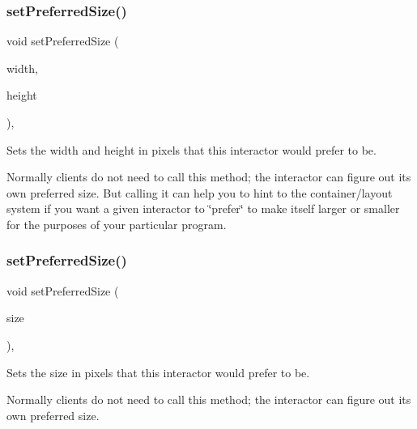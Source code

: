 \subsubsection{\texorpdfstring{set\+Preferred\+Size()}{setPreferredSize()}\hspace{0.1cm}{\footnotesize\ttfamily [1/2]}}
{\footnotesize\ttfamily void set\+Preferred\+Size (\begin{DoxyParamCaption}\item[{double}]{width,  }\item[{double}]{height }\end{DoxyParamCaption})\hspace{0.3cm}{\ttfamily [virtual]}, {\ttfamily [inherited]}}



Sets the width and height in pixels that this interactor would prefer to be. 

Normally clients do not need to call this method; the interactor can figure out its own preferred size. But calling it can help you to hint to the container/layout system if you want a given interactor to \char`\"{}prefer\char`\"{} to make itself larger or smaller for the purposes of your particular program. \mbox{\label{classGInteractor_aa22d9be4bc0e078bb0ea69b0fc9d7c75}} 
\subsubsection{\texorpdfstring{set\+Preferred\+Size()}{setPreferredSize()}\hspace{0.1cm}{\footnotesize\ttfamily [2/2]}}
{\footnotesize\ttfamily void set\+Preferred\+Size (\begin{DoxyParamCaption}\item[{const \mbox{\hyperlink{classGDimension}{G\+Dimension}} \&}]{size }\end{DoxyParamCaption})\hspace{0.3cm}{\ttfamily [virtual]}, {\ttfamily [inherited]}}



Sets the size in pixels that this interactor would prefer to be. 

Normally clients do not need to call this method; the interactor can figure out its own preferred size. \mbox{\label{classGInteractor_a3db429ab2fa52efd187eec0ed8cdd9f2}} 
